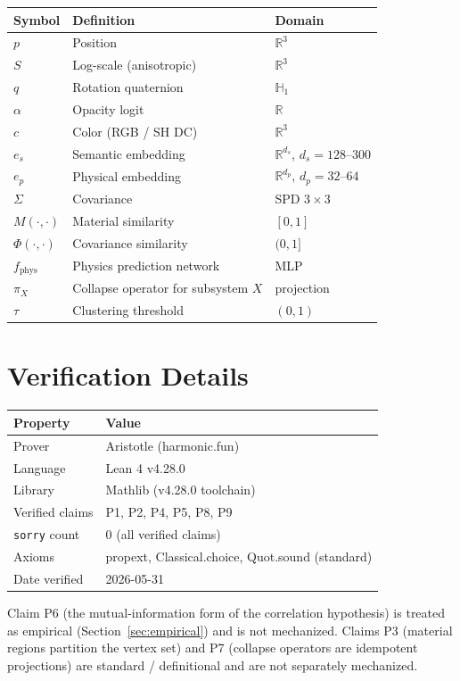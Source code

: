\documentclass[twoside,11pt]{article}
\begin{document}
\begin{center}
\begin{tabular}{lll}
\toprule
Symbol & Definition & Domain \\
\midrule
$p$ & Position & $\mathbb{R}^3$ \\
$S$ & Log-scale (anisotropic) & $\mathbb{R}^3$ \\
$q$ & Rotation quaternion & $\mathbb{H}_1$ \\
$\alpha$ & Opacity logit & $\mathbb{R}$ \\
$c$ & Color (RGB / SH DC) & $\mathbb{R}^3$ \\
$e_s$ & Semantic embedding & $\mathbb{R}^{d_s}$, $d_s = 128\text{--}300$ \\
$e_p$ & Physical embedding & $\mathbb{R}^{d_p}$, $d_p = 32\text{--}64$ \\
$\Sigma$ & Covariance & SPD $3\times 3$ \\
$M(\cdot,\cdot)$ & Material similarity & $[0,1]$ \\
$\Phi(\cdot,\cdot)$ & Covariance similarity & $(0,1]$ \\
$f_{\text{phys}}$ & Physics prediction network & MLP \\
$\pi_X$ & Collapse operator for subsystem $X$ & projection \\
$\tau$ & Clustering threshold & $(0,1)$ \\
\bottomrule
\end{tabular}
\end{center}

\section{Verification Details}
\label{app:verification}

\begin{center}
\begin{tabular}{ll}
\toprule
Property & Value \\
\midrule
Prover & Aristotle (harmonic.fun) \\
Language & Lean 4 v4.28.0 \\
Library & Mathlib (v4.28.0 toolchain) \\
Verified claims & P1, P2, P4, P5, P8, P9 \\
\texttt{sorry} count & 0 (all verified claims) \\
Axioms & propext, Classical.choice, Quot.sound (standard) \\
Date verified & 2026-05-31 \\
\bottomrule
\end{tabular}
\end{center}

\noindent
Claim P6 (the mutual-information form of the correlation hypothesis) is
treated as empirical (Section~\ref{sec:empirical}) and is not mechanized.
Claims P3 (material regions partition the vertex set) and P7 (collapse
operators are idempotent projections) are standard / definitional and are not
separately mechanized.
\end{document}
